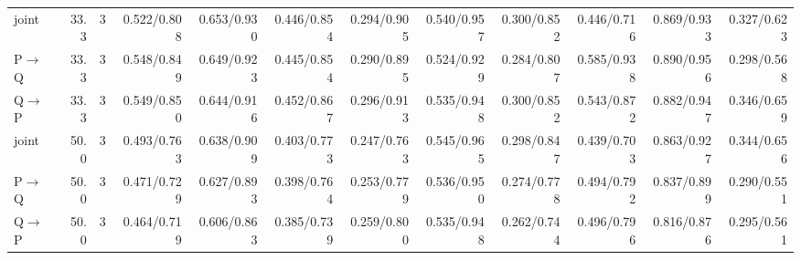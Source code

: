 \documentclass{article}
\begin{document}
\begin{longtable}{lrrrrrrrrrrr}
joint & 33.3 & 3 & 0.522/0.808 & 0.653/0.930 & 0.446/0.854 & 0.294/0.905 & 0.540/0.957 & 0.300/0.852 & 0.446/0.716 & 0.869/0.933 & 0.327/0.623 \\
P$\to$Q & 33.3 & 3 & 0.548/0.849 & 0.649/0.923 & 0.445/0.854 & 0.290/0.895 & 0.524/0.929 & 0.284/0.807 & 0.585/0.938 & 0.890/0.956 & 0.298/0.568 \\
Q$\to$P & 33.3 & 3 & 0.549/0.850 & 0.644/0.916 & 0.452/0.867 & 0.296/0.913 & 0.535/0.948 & 0.300/0.852 & 0.543/0.872 & 0.882/0.947 & 0.346/0.659 \\
joint & 50.0 & 3 & 0.493/0.763 & 0.638/0.909 & 0.403/0.773 & 0.247/0.763 & 0.545/0.965 & 0.298/0.847 & 0.439/0.703 & 0.863/0.927 & 0.344/0.656 \\
P$\to$Q & 50.0 & 3 & 0.471/0.729 & 0.627/0.893 & 0.398/0.764 & 0.253/0.779 & 0.536/0.950 & 0.274/0.778 & 0.494/0.792 & 0.837/0.899 & 0.290/0.551 \\
Q$\to$P & 50.0 & 3 & 0.464/0.719 & 0.606/0.863 & 0.385/0.739 & 0.259/0.800 & 0.535/0.948 & 0.262/0.744 & 0.496/0.796 & 0.816/0.876 & 0.295/0.561 \\
\bottomrule\end{longtable}
\clearpage
\end{document}
